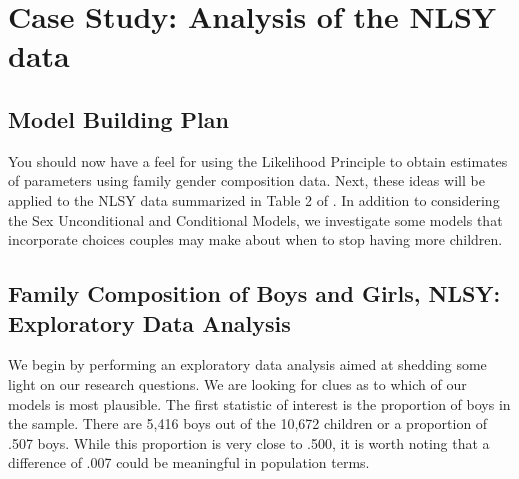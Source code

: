 \documentclass[
]{krantz}
\begin{document}
\hypertarget{case-study-analysis-of-the-nlsy-data}{%
\section{Case Study: Analysis of the NLSY data}\label{case-study-analysis-of-the-nlsy-data}}

\hypertarget{model-building-plan}{%
\subsection{Model Building Plan}\label{model-building-plan}}

You should now have a feel for using the Likelihood Principle to obtain estimates of parameters using family gender composition data. Next, these ideas will be applied to the NLSY data summarized in Table 2 of \citep{Rodgers2001}. In addition to considering the Sex Unconditional and Conditional Models, we investigate some models that incorporate choices couples may make about when to stop having more children.

\hypertarget{EDA.sec}{%
\subsection{Family Composition of Boys and Girls, NLSY: Exploratory Data Analysis}\label{EDA.sec}}

We begin by performing an exploratory data analysis aimed at shedding some light on our research questions. We are looking for clues as to which of our models is most plausible. The first statistic of interest is the proportion of boys in the sample. There are 5,416 boys out of the 10,672 children or a proportion of .507 boys. While this proportion is very close to .500, it is worth noting that a difference of .007 could be meaningful in population terms.
\end{document}
